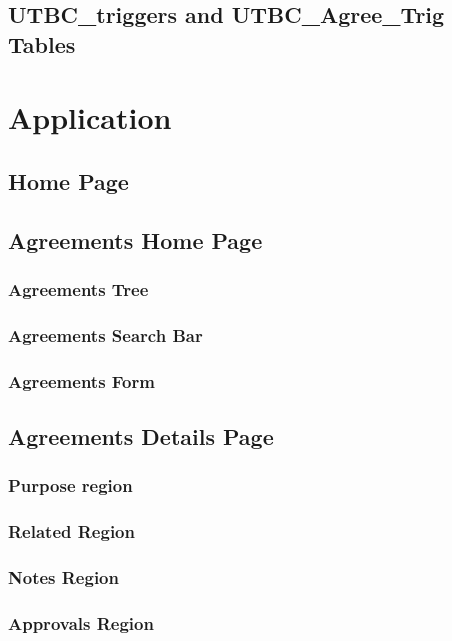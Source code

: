 \documentclass{report}
\begin{document}
\section{UTBC\_triggers and UTBC\_Agree\_Trig Tables}

\chapter{Application}

\section{Home Page}

\section{Agreements Home Page}

\subsection{Agreements Tree}

\subsection{Agreements Search Bar}

\subsection{Agreements Form}

\section{Agreements Details Page}

\subsection{Purpose region}

\subsection{Related Region}

\subsection{Notes Region}

\subsection{Approvals Region}
\end{document}
